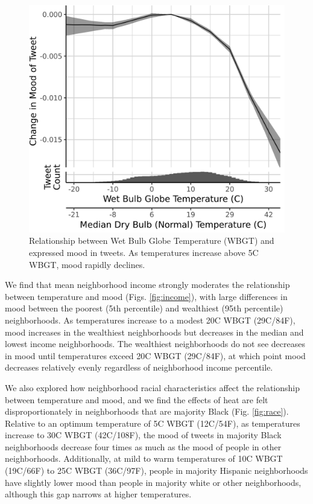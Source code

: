 \documentclass[9pt,twocolumn,twoside,lineno]{pnas-new}
\begin{document}
\begin{figure}[H]
 \centering
 \includegraphics[width=\linewidth]{../../res/wbgt.png}
 \caption{Relationship between Wet Bulb Globe Temperature (WBGT) and expressed mood in tweets. As temperatures increase above 5\textdegree C WBGT, mood rapidly declines.}
 \label{fig:wbgt}
\end{figure}

We find that mean neighborhood income strongly moderates the relationship between temperature and mood (Figs. \ref{fig:income}), with large differences in mood between the poorest (5th percentile) and wealthiest (95th percentile) neighborhoods. As temperatures increase to a modest 20\textdegree C WBGT (29\textdegree C/84\textdegree F), mood increases in the wealthiest neighborhoods but decreases in the median and lowest income neighborhoods. The wealthiest neighborhoods do not see decreases in mood until temperatures exceed 20\textdegree C WBGT (29\textdegree C/84\textdegree F), at which point mood decreases relatively evenly regardless of neighborhood income percentile.

We also explored how neighborhood racial characteristics affect the relationship between temperature and mood, and we find the effects of heat are felt disproportionately in neighborhoods that are majority Black (Fig. \ref{fig:race}). Relative to an optimum temperature of 5\textdegree C WBGT (12\textdegree C/54\textdegree F), as temperatures increase to 30\textdegree C WBGT (42\textdegree C/108\textdegree F), the mood of tweets in majority Black neighborhoods decrease four times as much as the mood of people in other neighborhoods. Additionally, at mild to warm temperatures of 10\textdegree C WBGT (19\textdegree C/66\textdegree F) to 25\textdegree C WBGT (36\textdegree C/97\textdegree F), people in majority Hispanic neighborhoods have slightly lower mood than people in majority white or other neighborhoods, although this gap narrows at higher temperatures.
\end{document}
